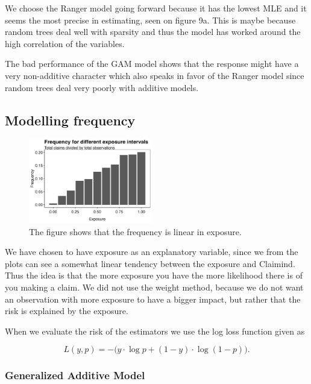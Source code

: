 \documentclass[
]{article}
\begin{document}
We choose the Ranger model going forward because it has the lowest MLE
and it seems the most precise in estimating, seen on figure 9a. This is
maybe because random trees deal well with sparsity and thus the model
has worked around the high correlation of the variables.

The bad performance of the GAM model shows that the response might have
a very non-additive character which also speaks in favor of the Ranger
model since random trees deal very poorly with additive models.

\newpage

\hypertarget{modelling-frequency}{%
\subsection{Modelling frequency}\label{modelling-frequency}}

\begin{figure}
  \begin{center}
    \includegraphics[width=0.48\textwidth]{figures/plot10.png}
  \end{center}
  \caption{The figure shows that the frequency is linear in exposure.}
\end{figure}

We have chosen to have exposure as an explanatory variable, since we
from the plots can see a somewhat linear tendency between the exposure
and Claimind. Thus the idea is that the more exposure you have the more
likelihood there is of you making a claim. We did not use the weight
method, because we do not want an observation with more exposure to have
a bigger impact, but rather that the risk is explained by the exposure.

When we evaluate the risk of the estimators we use the log loss function
given as

\[
L(y,p) = -\Big(y\cdot \log p + (1-y)\cdot \log(1-p)\Big).
\]

\hypertarget{generalized-additive-model-1}{%
\subsubsection{Generalized Additive
Model}\label{generalized-additive-model-1}}
\end{document}

